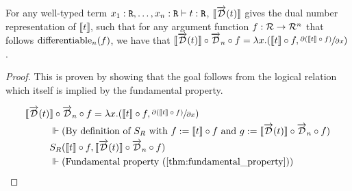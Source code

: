  \begin{theorem}\label{thm:macro_correctness}
    For any well-typed term $x_1 : \texttt{R}, \dots, x_n : \texttt{R} \vdash t : \texttt{R}$, $\llbracket\overrightarrow{\mathcal{D}}(t)\rrbracket$ gives the dual number representation of $\llbracket t \rrbracket$, such that for any argument function $f : \mathcal{R} \rightarrow \mathcal{R}^n$ that follows $\text{differentiable}_{n}(f)$, we have that $\llbracket \overrightarrow{\mathcal{D}}(t) \rrbracket \circ \overrightarrow{\mathcal{D}}_n \circ f = \lambda x. (\llbracket t \rrbracket \circ f, \sfrac{\partial{(\llbracket t \rrbracket \circ f)}}{\partial{x}})$.
  \end{theorem}

  \begin{proof}
    This is proven by showing that the goal follows from the logical relation which itself is implied by the fundamental property.

    \begin{align*}
      \llbracket \D(t) &\rrbracket \circ \D_n \circ f = \lambda x. (\llbracket t \rrbracket \circ f, \sfrac{\partial{(\llbracket t \rrbracket \circ f)}}{\partial{x}}) \\
      & \Vdash \text{(By definition of $S_R$ with $f := \llbracket t \rrbracket \circ f$ and $g := \llbracket \D(t) \rrbracket \circ \D_n \circ f$)} \\
      & S_R(\llbracket t \rrbracket \circ f, \llbracket \D(t) \rrbracket \circ \D_n \circ f) \\
      & \Vdash \text{(Fundamental property (\cref{thm:fundamental_property}))}
    \end{align*}
  \end{proof}

